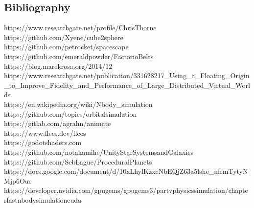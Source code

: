 \documentclass[12pt, DIV=calc]{scrartcl}
\begin{document}
\subsection{Bibliography}


https://www.researchgate.net/profile/Chris\-Thorne \\
https://github.com/Xyene/cube2sphere \\
https://github.com/petrocket/spacescape \\
https://github.com/emeraldpowder/FactorioBelts \\
https://blog.marekrosa.org/2014/12 \\
https://www.researchgate.net/publication/331628217\_Using\_a\_Floating\_Origin\_to\_Improve\_Fidelity\_and\_Performance\_of\_Large\_Distributed\_Virtual\_Worlds \\
https://en.wikipedia.org/wiki/N\-body\_simulation \\
https://github.com/topics/orbital\-simulation \\
https://gitlab.com/agrahn/animate \\
https://www.flecs.dev/flecs \\
https://godotshaders.com \\
https://github.com/notakamihe/Unity\-Star\-Systems\-and\-Galaxies \\
https://github.com/SebLague/Procedural\-Planets \\
https://docs.google.com/document/d/10xLhy\-lKzxeNbEQjZ63a5lshe\-\_nfrmTytyNMjp6Ouc \\
https://developer.nvidia.com/gpugems/gpugems3/part\-v\-physics\-simulation/chapter\-fast\-n\-body\-simulation\-cuda
\end{document}
